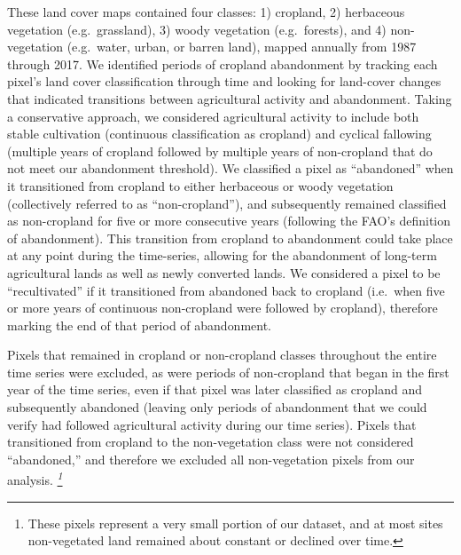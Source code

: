 \documentclass[
]{article}
\begin{document}
These land cover maps contained four classes: 1) cropland, 2) herbaceous vegetation (e.g.~grassland), 3) woody vegetation (e.g.~forests), and 4) non-vegetation (e.g.~water, urban, or barren land), mapped annually from 1987 through 2017.
We identified periods of cropland abandonment by tracking each pixel's land cover classification through time and looking for land-cover changes that indicated transitions between agricultural activity and abandonment.
Taking a conservative approach, we considered agricultural activity to include both stable cultivation (continuous classification as cropland) and cyclical fallowing (multiple years of cropland followed by multiple years of non-cropland that do not meet our abandonment threshold).
We classified a pixel as ``abandoned'' when it transitioned from cropland to either herbaceous or woody vegetation (collectively referred to as ``non-cropland''), and subsequently remained classified as non-cropland for five or more consecutive years (following the FAO's definition of abandonment).
This transition from cropland to abandonment could take place at any point during the time-series, allowing for the abandonment of long-term agricultural lands as well as newly converted lands.
We considered a pixel to be ``recultivated'' if it transitioned from abandoned back to cropland (i.e.~when five or more years of continuous non-cropland were followed by cropland), therefore marking the end of that period of abandonment.

Pixels that remained in cropland or non-cropland classes throughout the entire time series were excluded, as were periods of non-cropland that began in the first year of the time series, even if that pixel was later classified as cropland and subsequently abandoned (leaving only periods of abandonment that we could verify had followed agricultural activity during our time series).
Pixels that transitioned from cropland to the non-vegetation class were not considered ``abandoned,'' and therefore we excluded all non-vegetation pixels from our analysis. \emph{\footnote{These pixels represent a very small portion of our dataset, and at most sites non-vegetated land remained about constant or declined over time.}}
\end{document}
